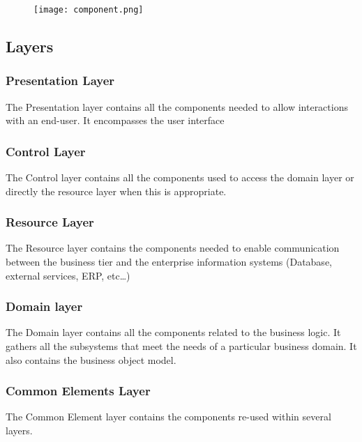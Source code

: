 \documentclass[10pt,a4paper]{article}
\begin{document}
\begin{figure}[H]
\texttt{[image: component.png]}
\end{figure}

\subsection{Layers}

\subsubsection{Presentation Layer}
The Presentation layer contains all the components needed to allow interactions with an end-user. It encompasses the user interface 
\subsubsection{	Control Layer}
The Control layer contains all the components used to access the domain layer or directly the resource layer when this is appropriate. 

\subsubsection{	Resource Layer}
The Resource layer contains the components needed to enable communication between the business tier and the enterprise information systems (Database, external services, ERP, etc…)

\subsubsection{	Domain layer}
The Domain layer contains all the components related to the business logic. It gathers all the subsystems that meet the needs of a particular business domain. It also contains the business object model.

\subsubsection{	Common Elements Layer}
The Common Element layer contains the components re-used within several layers.
\end{document}
